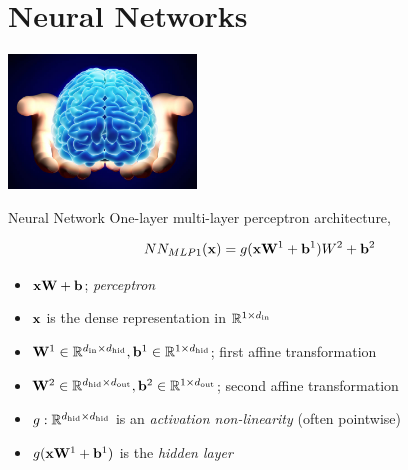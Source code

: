 \documentclass{beamer}
\begin{document}
\section{Neural Networks}

\begin{frame}
  \begin{center}
    \includegraphics[width=5cm]{brain}
  \end{center}
\end{frame}


\begin{frame}{Neural Network}
  One-layer multi-layer perceptron architecture,

  \[NN_{MLP1}(\mathbf{x}) =  g(\mathbf{x}\mathbf{W}^1 + \mathbf{b}^1)W^2 + \mathbf{b}^2\]
  \begin{itemize}
  \item $\mathbf{x}\mathbf{W} + \mathbf{b}$; \textit{perceptron}
  \item $\mathbf{x}$ is the dense representation in $\mathbb{R}^{1 \times {d_{\mathrm{in}}}}$
  \item $\mathbf{W}^1 \in \mathbb{R}^{{d_{\mathrm{in}}} \times {d_{\mathrm{hid}}}}, \mathbf{b}^1 \in \mathbb{R}^{1 \times {d_{\mathrm{hid}}}}$; first affine transformation
  \item $\mathbf{W}^2 \in \mathbb{R}^{{d_{\mathrm{hid}}} \times {d_{\mathrm{out}}}}, \mathbf{b}^2 \in \mathbb{R}^{1 \times {d_{\mathrm{out}}}}$; second affine transformation
  \item $g:\mathbb{R}^{{d_{\mathrm{hid}}} \times {d_{\mathrm{hid}}}}$ is an \textit{activation non-linearity} (often pointwise)
  \item $g(\mathbf{x}\mathbf{W}^1 + \mathbf{b}^1)$ is the \textit{hidden layer}
  \end{itemize}
\end{frame}
\end{document}

